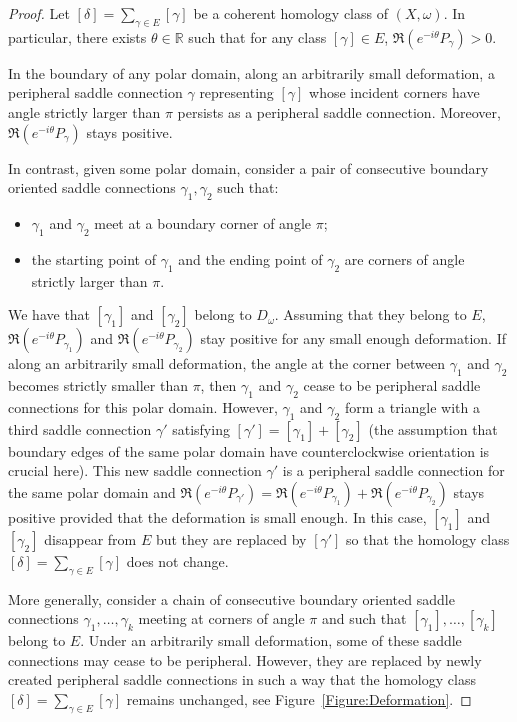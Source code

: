 \documentclass[11]{amsart}
\theoremstyle{plain}
\theoremstyle{definition}
\begin{document}
\begin{proof}
Let $[\delta]=\sum\limits_{\gamma \in E} [\gamma]$ be a coherent homology class of $(X, \omega)$. In particular, there exists $\theta \in \mathbb{R}$ such that for any class $[\gamma] \in E$, $\Re\left(e^{-i\theta} P_{\gamma} \right)>0$.
\par
In the boundary of any polar domain, along an arbitrarily small deformation, a peripheral saddle connection $\gamma$ representing $[\gamma]$ whose incident corners have angle strictly larger than $\pi$ persists as a peripheral saddle connection. Moreover, $\Re\left(e^{-i\theta} P_{\gamma} \right)$ stays positive.
\par
In contrast, given some polar domain, consider a pair of consecutive boundary oriented saddle connections $\gamma_{1},\gamma_{2}$ such that:
\begin{itemize}
    \item $\gamma_{1}$ and $\gamma_{2}$ meet at a boundary corner of angle $\pi$;
    \item the starting point of $\gamma_{1}$ and the ending point of $\gamma_{2}$ are corners of angle strictly larger than $\pi$.
\end{itemize}
We have that $[\gamma_{1}]$ and $[\gamma_{2}]$ belong to $D_\omega$. Assuming that they belong to $E$, $\Re\left(e^{-i\theta} P_{\gamma_{1}} \right)$ and $\Re\left(e^{-i\theta} P_{\gamma_{2}} \right)$ stay positive for any small enough deformation. If along an arbitrarily small deformation, the angle at the corner between $\gamma_{1}$ and $\gamma_{2}$ becomes strictly smaller than $\pi$, then $\gamma_{1}$ and $\gamma_{2}$ cease to be peripheral saddle connections for this polar domain. However, $\gamma_{1}$ and $\gamma_{2}$ form a triangle with a third saddle connection $\gamma'$ satisfying $[\gamma']=[\gamma_{1}]+[\gamma_{2}]$ (the assumption that boundary edges of the same polar domain have counterclockwise orientation is crucial here). This new saddle connection $\gamma'$ is a peripheral saddle connection for the same polar domain and $\Re\left(e^{-i\theta} P_{\gamma'} \right)= \Re\left(e^{-i\theta} P_{\gamma_{1}} \right) +\Re\left(e^{-i\theta} P_{\gamma_{2}} \right)$ stays positive provided that the deformation is small enough. In this case, $[\gamma_{1}]$ and $[\gamma_{2}]$ disappear from $E$ but they are replaced by $[\gamma']$ so that the homology class $[\delta]=\sum\limits_{\gamma \in E} [\gamma]$  does not change.
\par
More generally, consider a chain of consecutive boundary oriented saddle connections $\gamma_{1},\dots,\gamma_{k}$ meeting at corners of angle $\pi$ and such that $[\gamma_{1}],\dots,[\gamma_{k}]$ belong to $E$. Under an arbitrarily small deformation, some of these saddle connections may cease to be peripheral. However, they are replaced by newly created peripheral saddle connections in such a way that the homology class $[\delta]=\sum\limits_{\gamma \in E} [\gamma]$ remains unchanged, see Figure~\ref{Figure:Deformation}.

\end{proof}
\end{document}
